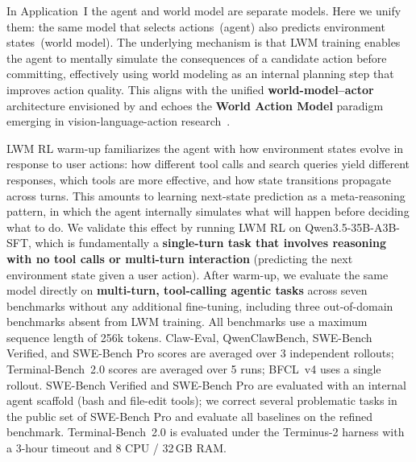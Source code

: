In Application~I the agent and world model are separate models.
Here we unify them: the same model that selects actions~(agent) also predicts environment states~(world model).
The underlying mechanism is that LWM training enables the agent to mentally simulate the consequences of a candidate action before committing, effectively using world modeling as an internal planning step that improves action quality.
This aligns with the unified \textbf{world-model--actor} architecture envisioned by \citet{lecun2022path} and echoes the \textbf{World Action Model} paradigm emerging in vision-language-action research~\citep{ye2026world}.

LWM RL warm-up familiarizes the agent with how environment states evolve in response to user actions: how different tool calls and search queries yield different responses, which tools are more effective, and how state transitions propagate across turns.
This amounts to learning next-state prediction as a meta-reasoning pattern, in which the agent internally simulates what will happen before deciding what to do.
We validate this effect by running LWM RL on Qwen3.5-35B-A3B-SFT, which is fundamentally a \textbf{single-turn task that involves reasoning with no tool calls or multi-turn interaction} (predicting the next environment state given a user action).
After warm-up, we evaluate the same model directly on \textbf{multi-turn, tool-calling agentic tasks} across seven benchmarks without any additional fine-tuning, including three out-of-domain benchmarks absent from LWM training.
All benchmarks use a maximum sequence length of 256k tokens.
Claw-Eval, QwenClawBench, SWE-Bench Verified, and SWE-Bench Pro scores are averaged over 3 independent rollouts; Terminal-Bench~2.0 scores are averaged over 5 runs; BFCL~v4 uses a single rollout.
SWE-Bench Verified and SWE-Bench Pro are evaluated with an internal agent scaffold (bash and file-edit tools); we correct several problematic tasks in the public set of SWE-Bench Pro and evaluate all baselines on the refined benchmark.
Terminal-Bench~2.0 is evaluated under the Terminus-2 harness with a 3-hour timeout and 8 CPU / 32\,GB RAM.


